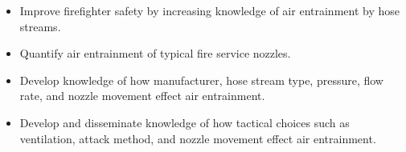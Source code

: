 \documentclass[12pt,oneside]{book}
\begin{document}
\begin{itemize}
	\item Improve firefighter safety by increasing knowledge of air entrainment by hose streams.
	\item Quantify air entrainment of typical fire service nozzles. 
	\item Develop knowledge of how manufacturer, hose stream type, pressure, flow rate, and nozzle movement effect air entrainment.
	\item Develop and disseminate knowledge of how tactical choices such as ventilation, attack method, and nozzle movement effect air entrainment. 
	\end{itemize}






\end{document}

